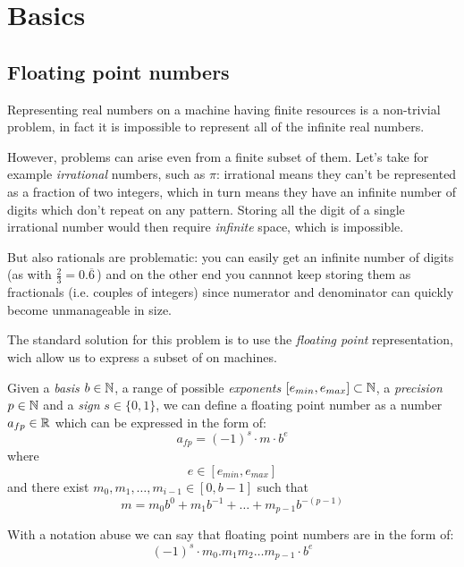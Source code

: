 \section{Basics}
\subsection{Floating point numbers}
Representing real numbers on a machine having finite resources is a non-trivial problem, in fact it is impossible to represent all of the infinite real numbers.

However, problems can arise even from a finite subset of them. Let's take for example \emph{irrational} numbers, such as $\pi$: irrational means they can't be represented as a fraction of two integers, which in turn means they have an infinite number of digits which don't repeat on any pattern. Storing all the digit of a single irrational number would then require \emph{infinite} space, which is impossible.

But also rationals are problematic: you can easily get an infinite number of digits (as with $\frac{2}{3} = 0.\overline{6}\,$) and on the other end you cannnot keep storing them as fractionals (i.e. couples of integers) since numerator and denominator can quickly become unmanageable in size.

The standard solution for this problem is to use the \emph{floating point} representation, wich allow us to express a subset of \RR on machines.
\begin{Def}
	Given a \emph{basis} $b \in \mathbb{N}$, a range of possible \emph{exponents} $[e_{min}, e_{max}] \subset \mathbb{N}$, a \emph{precision} $p \in \mathbb{N}$ and a \emph{sign} $s \in \{0,1\}$, we can define a floating point number as a number $a_{fp} \in \mathbb{R}$ which can be expressed in the form of:
	\begin{equation}
		a_{fp} = (-1)^s \cdot m \cdot b^e
	\end{equation}
	where
	\begin{equation*}
		e \in [e_{min}, e_{max}]
	\end{equation*}
	and there exist $m_0,m_1,\ldots,m_{i-1} \in [0,b-1]$ such that
	\begin{equation*}
		m = m_0 b^0 + m_1 b^{-1} + \ldots + m_{p-1} b^{-(p-1)}
	\end{equation*}
\end{Def}

With a notation abuse we can say that floating point numbers are in the form of:
\begin{equation*}
	(-1)^{s} \cdot m_0.m_1m_2 \ldots m_{p-1} \cdot b^e
\end{equation*}


